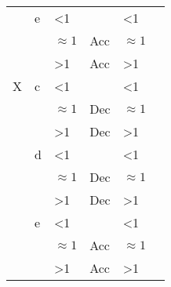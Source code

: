 \begin{longtable}[H]{l l l l l l}
                                             & e                                    & <1                                             &                                         & <1         &                 \\
                                             &                                      & $\approx1$                                     & Acc                                     & $\approx1$ &                 \\
                                             &                                      & >1                                             & Acc                                     & >1         &                 \\
  X                                          & c                                    & <1                                             &                                         & <1         &                 \\
                                             &                                      & $\approx1$                                     & Dec                                     & $\approx1$ &                 \\
                                             &                                      & >1                                             & Dec                                     & >1         &                 \\
                                             & d                                    & <1                                             &                                         & <1         &                 \\
                                             &                                      & $\approx1$                                     & Dec                                     & $\approx1$ &                 \\
                                             &                                      & >1                                             & Dec                                     & >1         &                 \\
                                             & e                                    & <1                                             &                                         & <1         &                 \\
                                             &                                      & $\approx1$                                     & Acc                                     & $\approx1$ &                 \\
                                             &                                      & >1                                             & Acc                                     & >1         &                 \\
\end{longtable}

